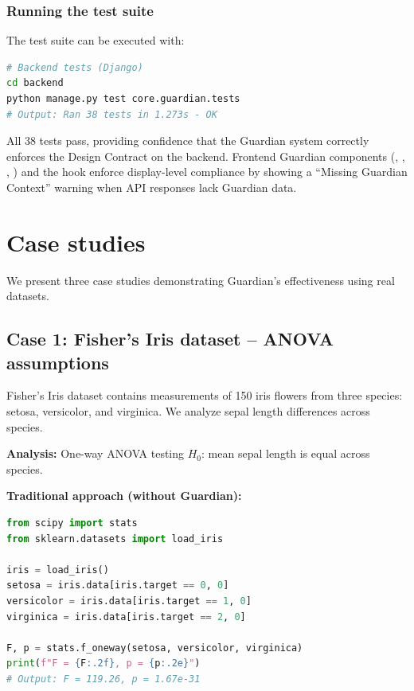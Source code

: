 \documentclass[article]{jss}
\begin{document}
\subsubsection{Running the test suite}

The test suite can be executed with:

\begin{lstlisting}[language=bash,caption={Running the Guardian test suite}]
# Backend tests (Django)
cd backend
python manage.py test core.guardian.tests
# Output: Ran 38 tests in 1.273s - OK
\end{lstlisting}

All 38 tests pass, providing confidence that the Guardian system correctly enforces the Design Contract on the backend. Frontend Guardian components (, , , ) and the  hook enforce display-level compliance by showing a ``Missing Guardian Context'' warning when API responses lack Guardian data.


\section{Case studies} \label{sec:cases}

We present three case studies demonstrating Guardian's effectiveness using real datasets.

\subsection{Case 1: Fisher's Iris dataset -- ANOVA assumptions}

Fisher's Iris dataset \citep{fisher1936use} contains measurements of 150 iris flowers from three species: setosa, versicolor, and virginica. We analyze sepal length differences across species.

\textbf{Analysis:} One-way ANOVA testing $H_0$: mean sepal length is equal across species.

\textbf{Traditional approach (without Guardian):}
\begin{lstlisting}[language=Python]
from scipy import stats
from sklearn.datasets import load_iris

iris = load_iris()
setosa = iris.data[iris.target == 0, 0]
versicolor = iris.data[iris.target == 1, 0]
virginica = iris.data[iris.target == 2, 0]

F, p = stats.f_oneway(setosa, versicolor, virginica)
print(f"F = {F:.2f}, p = {p:.2e}")
# Output: F = 119.26, p = 1.67e-31
\end{lstlisting}
\end{document}
